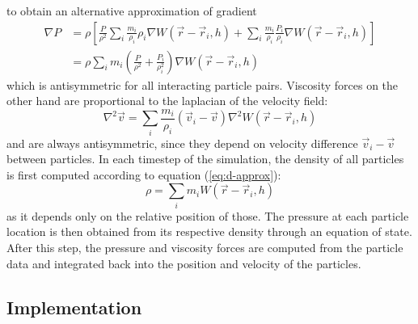\documentclass{llncs}
\begin{document}
to obtain an alternative approximation of gradient
\begin{align}
  \label{eq:grad-est}
  \nabla P & = \rho \left[ \frac{P}{\rho^2} \sum_i \frac{m_i}{\rho_i} \rho_i \nabla
             W(\vec{r}-\vec{r}_i, h)
             +
             \sum_i \frac{m_i}{\rho_i} \frac{P_i}{\rho_i} \nabla W(\vec{r}-\vec{r}_i, h)
             \right] \nonumber \\
           & = \rho \sum_i m_i \left(\frac{P}{\rho^2} + \frac{P_i}{\rho_i^2} \right)
             \nabla W(\vec{r}-\vec{r}_i, h)
\end{align}
which is antisymmetric for all interacting particle pairs. Viscosity forces on the other
hand are proportional to the laplacian of the velocity field:
\begin{equation}
  \label{eq:lapl-est}
  \nabla^2\vec{v} = \sum_i \frac{m_i}{\rho_i} (\vec{v}_i - \vec{v}) \nabla^2
  W(\vec{r}-\vec{r}_i, h)
\end{equation}
and are always antisymmetric, since they depend on velocity difference
$\vec{v}_i - \vec{v}$ between particles.  In each timestep of the simulation, the density
of all particles is first computed according to equation (\ref{eq:d-approx}):
\begin{equation}
  \label{eq:dens-est}
  \rho = \sum_i m_i W(\vec{r}-\vec{r}_i, h)
\end{equation}
as it depends only on the relative position of those. The pressure at each particle
location is then obtained from its respective density through an equation of state. After
this step, the pressure and viscosity forces are computed from the particle data and
integrated back into the position and velocity of the particles.

\subsection{Implementation}
\end{document}
